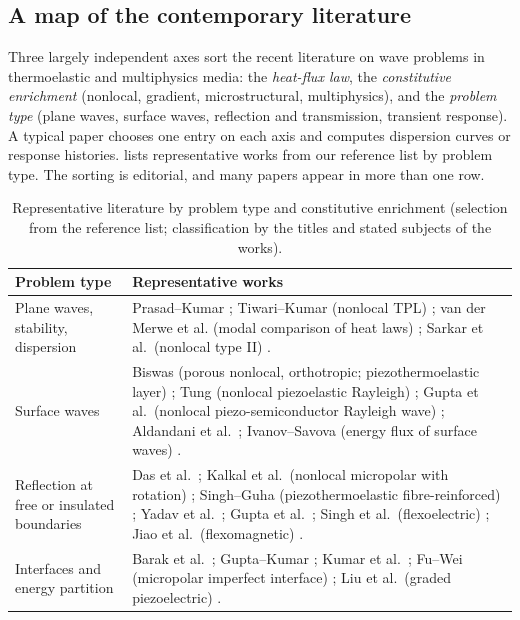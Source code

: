 \subsection{A map of the contemporary literature}
Three largely independent axes sort the recent literature on wave problems in thermoelastic and multiphysics media: the \emph{heat-flux law}, the \emph{constitutive enrichment} (nonlocal, gradient, microstructural, multiphysics), and the \emph{problem type} (plane waves, surface waves, reflection and transmission, transient response). A typical paper chooses one entry on each axis and computes dispersion curves or response histories.  lists representative works from our reference list by problem type. The sorting is editorial, and many papers appear in more than one row.

\begin{table}[t]\centering\small
\caption{Representative literature by problem type and constitutive enrichment (selection from the reference list; classification by the titles and stated subjects of the works).}\label{tab:streams}
\begin{tabularx}{\textwidth}{@{}p{3.2cm}X@{}}\toprule
Problem type & Representative works\\\midrule
Plane waves, stability, dispersion & Prasad--Kumar \citep{Prasad2020}; Tiwari--Kumar (nonlocal TPL) \citep{Tiwari2021}; van der Merwe et al. (modal comparison of heat laws) \citep{vanDerMerwe2021}; Sarkar et al.\ (nonlocal type II) \citep{Sarkar2019}.\\
Surface waves & Biswas (porous nonlocal, orthotropic; piezothermoelastic layer) \citep{Biswas2020a,Biswas2020}; Tung (nonlocal piezoelastic Rayleigh) \citep{Tung2019}; Gupta et al.\ (nonlocal piezo-semiconductor Rayleigh wave) \citep{Gupta2024}; Aldandani et al.\ \citep{Aldandani2026}; Ivanov--Savova (energy flux of surface waves) \citep{IvanovSavova1991}.\\
Reflection at free or insulated boundaries & Das et al.\ \citep{Das2008}; Kalkal et al.\ (nonlocal micropolar with rotation) \citep{Kalkal2020}; Singh--Guha (piezothermoelastic fibre-reinforced) \citep{Singh2020b}; Yadav et al.\ \citep{Yadav2023}; Gupta et al.\ \citep{Gupta2024a}; Singh et al.\ (flexoelectric) \citep{Singh2020c}; Jiao et al.\ (flexomagnetic) \citep{Jiao2024}.\\
Interfaces and energy partition & Barak et al.\ \citep{Barak2023,Barak2023IJP,Barak2023JTS,Barak2023MMMS}; Gupta--Kumar \citep{Gupta2023IJNMF,Gupta2023Energy}; Kumar et al.\ \citep{Kumar2023PhysScr,Kumar2019,Kumar2022,Kumar2024,Kumar2024a,Kumar2025,KumarKansal2017,Kumar2018}; Fu--Wei (micropolar imperfect interface) \citep{Fu2013}; Liu et al.\ (graded piezoelectric) \citep{Liu2020}.\\

\end{tabularx}
\end{table}

